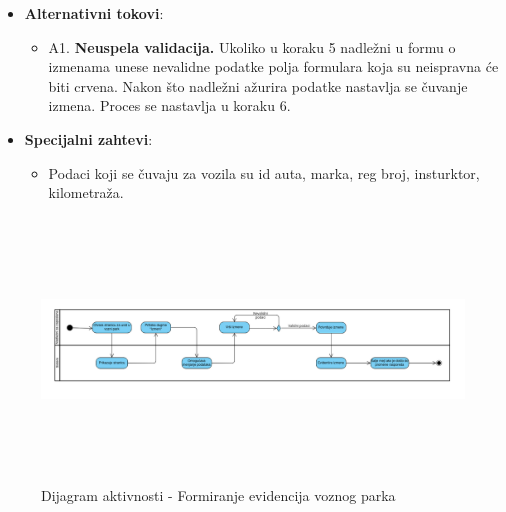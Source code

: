 \begin{itemize}
  \item \textbf{Alternativni tokovi}:
      \begin{itemize}
        \item A1. \textbf{Neuspela validacija.}
        Ukoliko u koraku 5 nadležni u formu o izmenama unese nevalidne podatke polja formulara koja su neispravna će biti crvena.
        Nakon što nadležni ažurira podatke nastavlja se čuvanje izmena. Proces se nastavlja u koraku 6.
      \end{itemize}
      
  \item \textbf{Specijalni zahtevi}:
      \begin{itemize}
        \item Podaci koji se čuvaju za vozila su id auta, marka, reg broj, insturktor, kilometraža. 
      \end{itemize}
\end{itemize}

\begin{figure}[H]
  \begin{center}
      \includegraphics[width=140mm, height=70mm]{Diagrams/evidencija_vozila.png}
  \end{center}
  \caption {Dijagram aktivnosti - Formiranje evidencija voznog parka}
  \label{activity_evidencija_vozila}

\end{figure}
